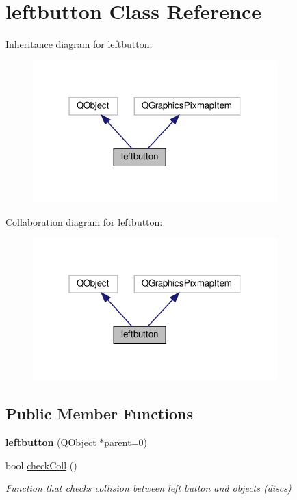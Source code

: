 \hypertarget{classleftbutton}{}\section{leftbutton Class Reference}
\label{classleftbutton}


Inheritance diagram for leftbutton\+:\nopagebreak
\begin{figure}[H]
\begin{center}
\leavevmode
\includegraphics[width=268pt]{classleftbutton__inherit__graph}
\end{center}
\end{figure}


Collaboration diagram for leftbutton\+:\nopagebreak
\begin{figure}[H]
\begin{center}
\leavevmode
\includegraphics[width=268pt]{classleftbutton__coll__graph}
\end{center}
\end{figure}
\subsection*{Public Member Functions}
\begin{DoxyCompactItemize}
\item 
\mbox{\label{classleftbutton_a2ba51e2ca7ed0afa9fcab8cd4bd44479}} 
{\bfseries leftbutton} (Q\+Object $\ast$parent=0)
\item 
bool \hyperlink{classleftbutton_a33d7fbc6aff28b0233286d3c99c79e83}{check\+Coll} ()
\begin{DoxyCompactList}\small\item\em Function that checks collision between left button and objects (discs) \end{DoxyCompactList}\end{DoxyCompactItemize}


